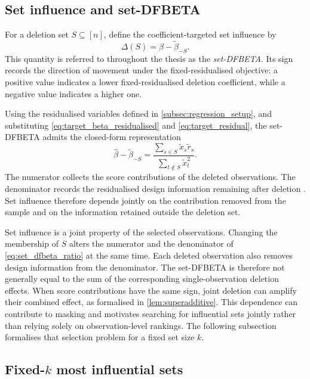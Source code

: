 \documentclass[../main.tex]{subfiles}
\begin{document}
\subsection{Set influence and set-DFBETA}
\label{subsec:set_influence}

For a deletion set \(S\subseteq[n]\), define the coefficient-targeted set influence by
\begin{equation}
\Delta(S)
=
\widehat{\beta}
-
\widetilde{\beta}_{-S}.
\label{eq:set_dfbeta}
\end{equation}
This quantity is referred to throughout the thesis as the \emph{set-DFBETA}. Its sign records the direction of movement under the fixed-residualised objective: a positive value indicates a lower fixed-residualised deletion coefficient, while a negative value indicates a higher one.

Using the residualised variables defined in \autoref{subsec:regression_setup}, and substituting \autoref{eq:target_beta_residualised} and \autoref{eq:target_residual}, the set-DFBETA admits the closed-form representation
\begin{equation}
\widehat{\beta}
-
\widetilde{\beta}_{-S}
=
\frac{
	\sum_{s\in S}\widetilde{x}_s\widetilde{r}_s
}{
	\sum_{t\notin S}\widetilde{x}_t^2
}.
\label{eq:set_dfbeta_ratio}
\end{equation}
The numerator collects the score contributions of the deleted observations. The denominator records the residualised design information remaining after deletion \parencite{konrad2026finding}. Set influence therefore depends jointly on the contribution removed from the sample and on the information retained outside the deletion set.

Set influence is a joint property of the selected observations. Changing the membership of $S$ alters the numerator and the denominator of \autoref{eq:set_dfbeta_ratio} at the same time. Each deleted observation also removes design information from the denominator. The set-DFBETA is therefore not generally equal to the sum of the corresponding single-observation deletion effects. When score contributions have the same sign, joint deletion can amplify their combined effect, as formalised in \autoref{lem:superadditive}. This dependence can contribute to masking and motivates searching for influential sets jointly rather than relying solely on observation-level rankings. The following subsection formalises that selection problem for a fixed set size $k$.

\subsection{Fixed-\texorpdfstring{$k$}{k} most influential sets}
\label{subsec:fixed_k_mis}
\end{document}
